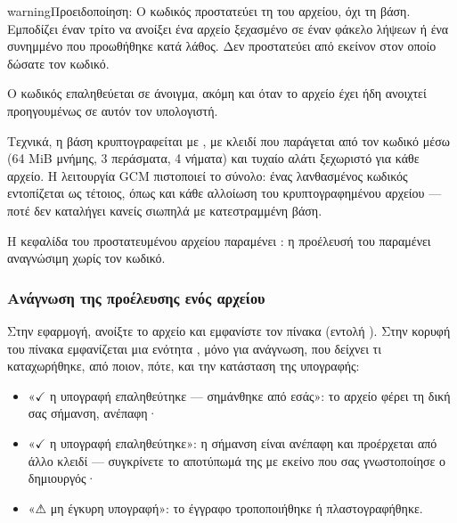 \documentclass[letterpaper,10pt,greek]{sphinxmanual}
\begin{document}
\begin{sphinxadmonition}{warning}{Προειδοποίηση:}
\sphinxAtStartPar
Ο κωδικός προστατεύει τη  του αρχείου, όχι τη βάση. Εμποδίζει έναν τρίτο να ανοίξει ένα αρχείο ξεχασμένο σε έναν φάκελο λήψεων ή ένα συνημμένο που προωθήθηκε κατά λάθος. Δεν προστατεύει από εκείνον στον οποίο δώσατε τον κωδικό.
\end{sphinxadmonition}

\sphinxAtStartPar
Ο κωδικός επαληθεύεται σε  άνοιγμα, ακόμη και όταν το αρχείο έχει ήδη ανοιχτεί προηγουμένως σε αυτόν τον υπολογιστή.

\sphinxAtStartPar
Τεχνικά, η βάση κρυπτογραφείται με , με κλειδί που παράγεται από τον κωδικό μέσω  (64 MiB μνήμης, 3 περάσματα, 4 νήματα) και τυχαίο αλάτι ξεχωριστό για κάθε αρχείο. Η λειτουργία GCM πιστοποιεί το σύνολο: ένας λανθασμένος κωδικός εντοπίζεται ως τέτοιος, όπως και κάθε αλλοίωση του κρυπτογραφημένου αρχείου — ποτέ δεν καταλήγει κανείς σιωπηλά με κατεστραμμένη βάση.

\sphinxAtStartPar
Η κεφαλίδα του προστατευμένου αρχείου παραμένει : η προέλευσή του παραμένει αναγνώσιμη χωρίς τον κωδικό.


\subsubsection{Ανάγνωση της προέλευσης ενός αρχείου}
\label{\detokenize{manuel:lire-l-origine-d-un-fichier}}
\sphinxAtStartPar
Στην εφαρμογή, ανοίξτε το αρχείο και εμφανίστε τον πίνακα  (εντολή ). Στην κορυφή του πίνακα εμφανίζεται μια ενότητα , μόνο για ανάγνωση, που δείχνει τι καταχωρήθηκε, από ποιον, πότε, και την κατάσταση της υπογραφής:
\begin{itemize}
\item {} 
\sphinxAtStartPar
«\(\checkmark\) η υπογραφή επαληθεύτηκε — σημάνθηκε από εσάς»: το αρχείο φέρει τη δική σας σήμανση, ανέπαφη·

\item {} 
\sphinxAtStartPar
«\(\checkmark\) η υπογραφή επαληθεύτηκε»: η σήμανση είναι ανέπαφη και προέρχεται από άλλο κλειδί — συγκρίνετε το αποτύπωμά της με εκείνο που σας γνωστοποίησε ο δημιουργός·

\item {} 
\sphinxAtStartPar
«⚠ μη έγκυρη υπογραφή»: το έγγραφο τροποποιήθηκε ή πλαστογραφήθηκε.

\end{itemize}
\end{document}
